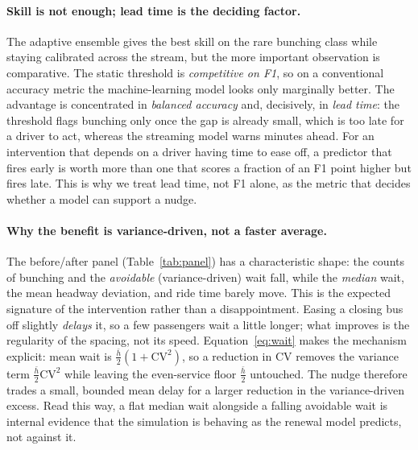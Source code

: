 \documentclass[final,5p,times,twocolumn,authoryear]{elsarticle}
\begin{document}
\paragraph{Skill is not enough; lead time is the deciding factor.}
The adaptive ensemble gives the best skill on the rare bunching class while staying calibrated
across the stream, but the more important observation is comparative. The static threshold is
\emph{competitive on F1}, so on a conventional accuracy metric the machine-learning model looks only
marginally better. The advantage is concentrated in \emph{balanced accuracy} and, decisively, in
\emph{lead time}: the threshold flags bunching only once the gap is already small, which is too late
for a driver to act, whereas the streaming model warns minutes ahead. For an intervention that
depends on a driver having time to ease off, a predictor that fires early is worth more than one
that scores a fraction of an F1 point higher but fires late. This is why we treat lead time, not F1
alone, as the metric that decides whether a model can support a nudge.

\paragraph{Why the benefit is variance-driven, not a faster average.}
The before/after panel (Table~\ref{tab:panel}) has a characteristic shape: the counts of bunching
and the \emph{avoidable} (variance-driven) wait fall, while the \emph{median} wait, the mean headway
deviation, and ride time barely move. This is the expected signature of the intervention rather than
a disappointment. Easing a closing bus off slightly \emph{delays} it, so a few passengers wait a
little longer; what improves is the regularity of the spacing, not its speed. Equation~\eqref{eq:wait}
makes the mechanism explicit: mean wait is $\tfrac{\bar h}{2}(1+\mathrm{CV}^2)$, so a reduction in
$\mathrm{CV}$ removes the variance term $\tfrac{\bar h}{2}\mathrm{CV}^2$ while leaving the
even-service floor $\tfrac{\bar h}{2}$ untouched. The nudge therefore trades a small, bounded mean
delay for a larger reduction in the variance-driven excess. Read this way, a flat median wait
alongside a falling avoidable wait is internal evidence that the simulation is behaving as the
renewal model predicts, not against it.
\end{document}
